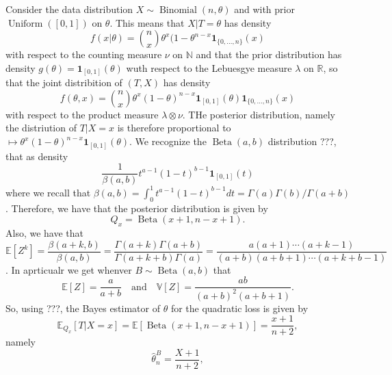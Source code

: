 \documentclass[
	fontsize=11pt, %
	twoside=false, %
	numbers=noenddot, %
]{kaobook}
\DeclareMathOperator{\bet}{Beta}
\DeclareMathOperator{\bin}{Binomial}
\DeclareMathOperator{\uni}{Uniform}
\newcommand{\E}{\mathbb E}
\newcommand{\R}{\mathbb R}
\newcommand{\N}{\mathbb N}
\newcommand{\var}{\mathbb V}
\newcommand{\wh}{\widehat}
\newcommand{\ind}[1]{\mathbf 1_{#1}}
\begin{document}
Consider the data distribution $X \sim \bin(n, \theta)$ and with prior $\uni([0, 1])$ on $\theta$. This means that $X | T = \theta$ has density
\begin{equation*}
	f(x | \theta) = \binom{n}{x} \theta^x (1 - \theta^{n-x} \ind{\{ 0, \ldots, n\}}(x)	
\end{equation*}
with respect to the counting measure $\nu$ on $\N$ and that the prior distribution has density $g(\theta) = \ind{[0, 1]}(\theta)$ wuth respect to the Lebuesgye measure $\lambda$ on $\R$, so that the joint distribition of $(T, X)$ has density
\begin{equation*}
	f(\theta, x) = \binom{n}{x} \theta^x (1 - \theta)^{n - x} \ind{[0, 1]}(\theta) 
	\ind{\{ 0, \ldots, n\}}(x)
\end{equation*}
with respect to the product measure $\lambda \otimes \nu$. THe posterior distribution, namely the distriution of $T | X=x$ is therefore proportional to $\mapsto \theta^x (1 - \theta)^{n - x} \ind{[0, 1]}(\theta)$. We recognize the $\bet(a, b)$ distribution ???, that as density
\begin{equation*}
	\frac{1}{\beta(a, b)} t^{a-1} (1 - t)^{b-1} \ind{[0, 1]}(t)
\end{equation*}
where we recall that $\beta(a, b) = \int_0^1 t^{a-1} (1 - t)^{b-1} d t = \Gamma(a) \Gamma(b)  / \Gamma(a + b)$.
Therefore, we have that the posterior distribution is given by
\begin{equation*}
	Q_x = \bet(x + 1, n - x + 1).
\end{equation*}
Also, we have that
\begin{equation*}
	\E[Z^k] = \frac{\beta(a + k, b)}{\beta(a, b)} = \frac{\Gamma(a + k) \Gamma(a + b)}{\Gamma(a + k + b) \Gamma(a)} = \frac{a (a + 1) \cdots (a + k -1)}{(a + b) (a + b + 1) \cdots (a + k + b - 1)}
\end{equation*}
. In aprticualr we get whenver $B \sim \bet(a, b)$ that
\begin{equation*}
	\E[Z] = \frac{a}{a + b} \quad \text{and} \quad \var[Z] = \frac{ab}{(a + b)^2 (a + b + 1)}.
\end{equation*}
So, using ???, the Bayes estimator of $\theta$ for the quadratic loss is given by 
\begin{equation*}
	\E_{Q_x}[T | X=x] = \E[ \bet(x+1, n - x + 1)] = \frac{x + 1}{n + 2},
\end{equation*}
namely
\begin{equation*}
	\wh \theta_n^B = \frac{X + 1}{n + 2},
\end{equation*}
\end{document}
